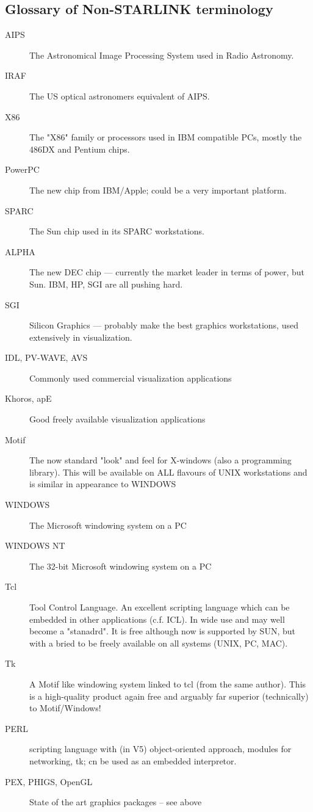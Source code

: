 \subsection{Glossary of Non-STARLINK terminology}

\begin{description}
\item[AIPS]The Astronomical Image Processing System used in Radio Astronomy.
\item[IRAF]The US optical astronomers equivalent of AIPS.
\item[X86]The "X86" family or processors used in IBM compatible PCs, mostly
the 486DX and Pentium chips.
\item[PowerPC]The new chip from IBM/Apple; could be a very important platform.
\item[SPARC]The Sun chip used in its SPARC workstations.
\item[ALPHA]The new DEC chip --- currently the market leader in terms of
power, but Sun. IBM, HP, SGI are all pushing hard.
\item[SGI]Silicon Graphics --- probably make the best graphics workstations,
used extensively in visualization.
\item[IDL, PV-WAVE, AVS]Commonly used commercial visualization applications
\item[Khoros, apE]Good freely available visualization applications
\item[Motif]The now standard "look" and feel for X-windows (also a
programming library).  This will be available on ALL flavours of UNIX
workstations and is similar in appearance to WINDOWS
\item[WINDOWS]The Microsoft windowing system on a PC
\item[WINDOWS NT]The 32-bit Microsoft windowing system on a PC
\item[Tcl]Tool Control Language.  An excellent scripting language which
can be embedded in other applications (c.f. ICL).  In wide use and may
well become a "stanadrd".  It is free although now is supported by
SUN, but with a bried to be freely available on all systems (UNIX, PC,
MAC).
\item[Tk]A Motif like windowing system linked to tcl (from the same author).
This is a high-quality product again free and arguably far superior
(technically) to Motif/Windows!
\item[PERL]scripting language with (in V5) object-oriented approach, modules
for networking, tk; cn be used as an embedded interpretor.
\item[PEX, PHIGS, OpenGL]State of the art graphics packages -- see above

\end{description}
